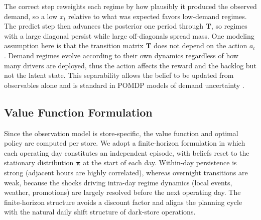 \documentclass[preprint,11pt,authoryear]{elsarticle}
\newcommand{\bvec}[1]{\mathbf{#1}}
\theoremstyle{remark}
\begin{document}
The correct step reweights each regime by how plausibly it produced the observed demand, so a low $x_t$ relative to what was expected favors low-demand regimes. The predict step then advances the posterior one period through $\bvec{T}$, so regimes with a large diagonal persist while large off-diagonals spread mass. One modeling assumption here is that the transition matrix $\bvec{T}$ does not depend on the action $a_t$. Demand regimes evolve according to their own dynamics regardless of how many drivers are deployed, thus the action affects the reward and the backlog but not the latent state. This separability allows the belief to be updated from observables alone and is standard in POMDP models of demand uncertainty \citep{treharne2002adaptive}.

\subsection{Value Function Formulation}
\label{sec:bellman}

Since the observation model is store-specific, the value function and optimal policy are computed per store. We adopt a finite-horizon formulation in which each operating day constitutes an independent episode, with beliefs reset to the stationary distribution $\bvec{\pi}$ at the start of each day. Within-day persistence is strong (adjacent hours are highly correlated), whereas overnight transitions are weak, because the shocks driving intra-day regime dynamics (local events, weather, promotions) are largely resolved before the next operating day. The finite-horizon structure avoids a discount factor and aligns the planning cycle with the natural daily shift structure of dark-store operations.
\end{document}
